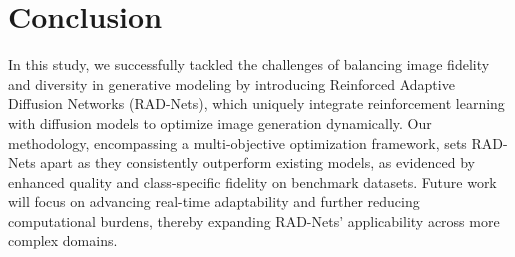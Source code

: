\section{Conclusion}

In this study, we successfully tackled the challenges of balancing image fidelity and diversity in generative modeling by introducing Reinforced Adaptive Diffusion Networks (RAD-Nets), which uniquely integrate reinforcement learning with diffusion models to optimize image generation dynamically. Our methodology, encompassing a multi-objective optimization framework, sets RAD-Nets apart as they consistently outperform existing models, as evidenced by enhanced quality and class-specific fidelity on benchmark datasets. Future work will focus on advancing real-time adaptability and further reducing computational burdens, thereby expanding RAD-Nets' applicability across more complex domains.
